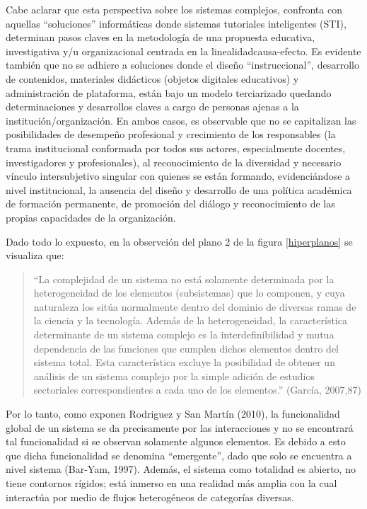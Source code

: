 Cabe aclarar que esta perspectiva sobre los sistemas complejos, confronta con aquellas “soluciones” informáticas donde sistemas tutoriales inteligentes (STI), determinan pasos claves en la metodología de una propuesta educativa,
investigativa y/u organizacional centrada en la linealidadcausa-efecto. Es evidente también que no se  adhiere  a  soluciones donde   el  diseño “instruccional”, desarrollo de contenidos, materiales didácticos (objetos digitales educativos) y administración de plataforma, están bajo un modelo terciarizado quedando determinaciones y desarrollos claves a cargo de personas ajenas a la institución/organización. En ambos casos, es observable que no se capitalizan las posibilidades de desempeño profesional y crecimiento de los responsables (la trama institucional conformada por todos sus actores, especialmente docentes, investigadores y profesionales), al reconocimiento de la
diversidad y necesario vínculo intersubjetivo singular con quienes se están
formando, evidenciándose a nivel institucional, la ausencia del diseño y
desarrollo de una política académica de formación  permanente, de
promoción del diálogo y reconocimiento de las propias capacidades de la
organización.

Dado todo lo expuesto, en la observción del plano 2 de la figura
\ref{hiperplanos} se visualiza que:
     
\begin{quote}
     “La complejidad de un sistema no está solamente determinada por la
     heterogeneidad de los elementos (subsistemas) que lo componen, y cuya
     naturaleza los sitúa normalmente dentro del dominio de diversas ramas de la
     ciencia y la tecnología. Además de la heterogeneidad, la característica
     determinante de un sistema complejo es la interdefinibilidad y mutua
     dependencia de las funciones que cumplen dichos elementos dentro del
     sistema total. Esta característica excluye la posibilidad de obtener
     un análisis de un sistema complejo por la simple adición de estudios
     sectoriales correspondientes a cada uno de los elementos.” (García,
     2007,87)

\end{quote} 

Por lo tanto, como exponen Rodriguez y San Martín (2010), la funcionalidad global de un sistema se da precisamente
por las interacciones y no se encontrará tal funcionalidad si se
observan solamente algunos elementos. Es debido a esto que dicha
funcionalidad se denomina “emergente”, dado que solo se encuentra a
nivel sistema (Bar-Yam, 1997). Además, el sistema como totalidad es
abierto, no tiene contornos rígidos; está inmerso en una realidad más
amplia con la cual interactúa por medio de flujos heterogéneos de categorías diversas.

